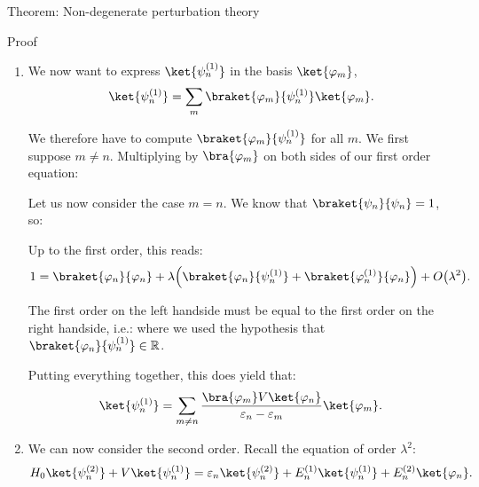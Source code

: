 \documentclass[a4paper]{article}
\begin{document}
\begin{parag}{Theorem: Non-degenerate perturbation theory}
\begin{subparag}{Proof}
\begin{enumerate}[left=0pt]
        
        \item We now want to express $\ket{\psi_n^{\left(1\right)}}$ in the basis $\ket{\phi_m}$,
        \[\ket{\psi_n^{\left(1\right)}} = \sum_{m} \braket{\phi_m}{\psi_n^{\left(1\right)}} \ket{\phi_m}.\]

        We therefore have to compute $\braket{\phi_m}{\psi_n^{\left(1\right)}}$ for all $m$. We first suppose $m \neq n$. Multiplying by $\bra{\phi_m}$ on both sides of our first order equation: 

        Let us now consider the case $m = n$. We know that $\braket{\psi_n}{\psi_n} = 1$, so:

        Up to the first order, this reads: 
        \[1 = \braket{\phi_n}{\phi_n} + \lambda\left(\braket{\phi_n}{\psi_n^{\left(1\right)}} + \braket{\phi_n^{\left(1\right)}}{\phi_n}\right) + O\left(\lambda^2\right).\]

        The first order on the left handside must be equal to the first order on the right handside, i.e.:
        where we used the hypothesis that $\braket{\phi_n}{\psi_n^{\left(1\right)}} \in \mathbb{R}$.

        Putting everything together, this does yield that:
        \[\ket{\psi_n^{\left(1\right)}} = \sum_{m \neq n} \frac{\bra{\phi_m} V \ket{\phi_n}}{\epsilon_n - \epsilon_m} \ket{\phi_m}.\]
        
        \item We can now consider the second order. Recall the equation of order $\lambda^2$:
        \[H_0 \ket{\psi_n^{\left(2\right)}} + V \ket{\psi_n^{\left(1\right)}} = \epsilon_n \ket{\psi_n^{\left(2\right)}} + E_n^{\left(1\right)} \ket{\psi_n^{\left(1\right)}} + E_n^{\left(2\right)} \ket{\phi_n}.\]


\end{enumerate}
\end{subparag}
\end{parag}
\end{document}
